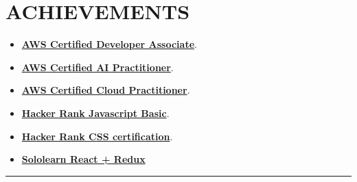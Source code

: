 \documentclass[100pt,a4paper]{article}
\newcommand{\sectionline}{
\begin{center}
\vspace{-10pt}
\rule{1\textwidth}{0.5pt}
\end{center}
\vspace{1pt}
}
\begin{document}
\section*{ACHIEVEMENTS}
\begin{itemize}
\item \href{https://www.credly.com/earner/earned/share/b3cbb0c0-3e79-44e8-9014-0f037b0dc12c} {\bf AWS Certified Developer Associate}.
\item \href{https://www.credly.com/badges/ed0f0afe-4927-4488-86b0-3956fb83e37c/linked_in_profile}{\bf AWS Certified AI Practitioner}.
\item \href{https://www.credly.com/badges/50f28d0d-2647-4f37-b78e-6bf5ce002d4e/linked_in_profile}{\bf AWS Certified Cloud Practitioner}.
\item \href{https://www.hackerrank.com/certificates/e8c2450c7b38/}{\bf Hacker Rank Javascript Basic}.
\item \href{https://www.hackerrank.com/certificates/3348c7124f7d} {\bf Hacker Rank CSS certification}.
\item \href{https://www.sololearn.com/en/certificates/CT-KRZNT5XO} {\bf Sololearn React + Redux}
\end{itemize}

\sectionline
\end{document}
